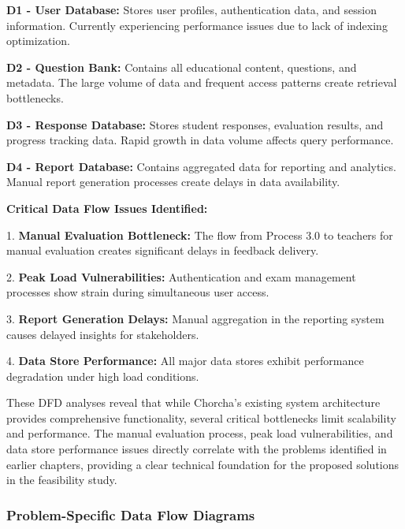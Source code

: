 \documentclass[12pt,a4paper,oneside]{book}
\begin{document}
\textbf{D1 - User Database:} Stores user profiles, authentication data, and session information. Currently experiencing performance issues due to lack of indexing optimization.

\vspace{0.3cm}
\textbf{D2 - Question Bank:} Contains all educational content, questions, and metadata. The large volume of data and frequent access patterns create retrieval bottlenecks.

\vspace{0.3cm}
\textbf{D3 - Response Database:} Stores student responses, evaluation results, and progress tracking data. Rapid growth in data volume affects query performance.

\vspace{0.3cm}
\textbf{D4 - Report Database:} Contains aggregated data for reporting and analytics. Manual report generation processes create delays in data availability.

\vspace{0.5cm}
\textbf{Critical Data Flow Issues Identified:}

1. \textbf{Manual Evaluation Bottleneck:} The flow from Process 3.0 to teachers for manual evaluation creates significant delays in feedback delivery.

\vspace{0.3cm}
2. \textbf{Peak Load Vulnerabilities:} Authentication and exam management processes show strain during simultaneous user access.

\vspace{0.3cm}
3. \textbf{Report Generation Delays:} Manual aggregation in the reporting system causes delayed insights for stakeholders.

\vspace{0.3cm}
4. \textbf{Data Store Performance:} All major data stores exhibit performance degradation under high load conditions.

\vspace{0.5cm}
These DFD analyses reveal that while Chorcha's existing system architecture provides comprehensive functionality, several critical bottlenecks limit scalability and performance. The manual evaluation process, peak load vulnerabilities, and data store performance issues directly correlate with the problems identified in earlier chapters, providing a clear technical foundation for the proposed solutions in the feasibility study.

\vspace{0.5cm}
\newpage
\subsubsection{Problem-Specific Data Flow Diagrams}
\end{document}
